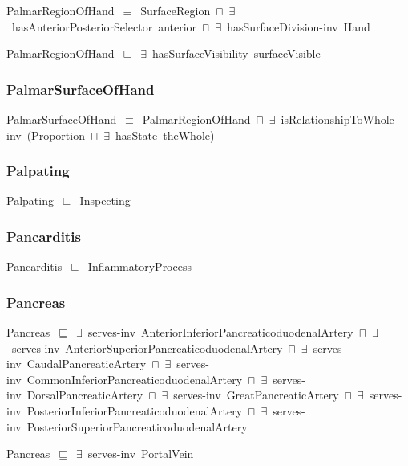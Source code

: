 \documentclass{article}
\begin{document}
PalmarRegionOfHand~\ensuremath{\equiv}~SurfaceRegion~\ensuremath{\sqcap}~\ensuremath{\exists}~hasAnteriorPosteriorSelector~anterior~\ensuremath{\sqcap}~\ensuremath{\exists}~hasSurfaceDivision-inv~Hand

PalmarRegionOfHand~\ensuremath{\sqsubseteq}~\ensuremath{\exists}~hasSurfaceVisibility~surfaceVisible~

\subsubsection*{PalmarSurfaceOfHand}

PalmarSurfaceOfHand~\ensuremath{\equiv}~PalmarRegionOfHand~\ensuremath{\sqcap}~\ensuremath{\exists}~isRelationshipToWhole-inv~(Proportion~\ensuremath{\sqcap}~\ensuremath{\exists}~hasState~theWhole)

\subsubsection*{Palpating}

Palpating~\ensuremath{\sqsubseteq}~Inspecting~

\subsubsection*{Pancarditis}

Pancarditis~\ensuremath{\sqsubseteq}~InflammatoryProcess~

\subsubsection*{Pancreas}

Pancreas~\ensuremath{\sqsubseteq}~\ensuremath{\exists}~serves-inv~AnteriorInferiorPancreaticoduodenalArtery~\ensuremath{\sqcap}~\ensuremath{\exists}~serves-inv~AnteriorSuperiorPancreaticoduodenalArtery~\ensuremath{\sqcap}~\ensuremath{\exists}~serves-inv~CaudalPancreaticArtery~\ensuremath{\sqcap}~\ensuremath{\exists}~serves-inv~CommonInferiorPancreaticoduodenalArtery~\ensuremath{\sqcap}~\ensuremath{\exists}~serves-inv~DorsalPancreaticArtery~\ensuremath{\sqcap}~\ensuremath{\exists}~serves-inv~GreatPancreaticArtery~\ensuremath{\sqcap}~\ensuremath{\exists}~serves-inv~PosteriorInferiorPancreaticoduodenalArtery~\ensuremath{\sqcap}~\ensuremath{\exists}~serves-inv~PosteriorSuperiorPancreaticoduodenalArtery~

Pancreas~\ensuremath{\sqsubseteq}~\ensuremath{\exists}~serves-inv~PortalVein~
\end{document}
